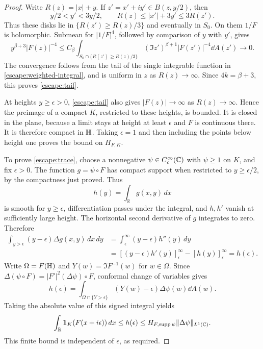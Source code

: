 \begin{proof}
Write $R(z)=|x|+y$.  If $z'=x'+iy'\in B(z,y/2)$, then
\[
 y/2<y'<3y/2,\qquad
 R(z)\le |x'|+3y'\le3R(z').
\]
Thus these disks lie in $\{R(z')\ge R(z)/3\}$ and eventually in $S_0$.
On them $1/F$ is holomorphic.  Submean for $|1/F|^4$, followed by
comparison of $y$ with $y'$, gives
\begin{equation}
 y^{\beta+3}|F(z)|^{-4}
 \le C_\beta\!\int_{S_0\cap\{R(z')\ge R(z)/3\}}
       (\Im z')^{\beta+1}|F(z')|^{-4}\dd A(z')
 \longrightarrow0.
 \label{escape:uniform-tail}
\end{equation}
The convergence follows from the tail of the single integrable function
in \eqref{escape:weighted-integral}, and is uniform in $z$ as
$R(z)\to\infty$.  Since $4k=\beta+3$, this proves
\eqref{escape:tail}.

At heights $y\ge\epsilon>0$, \eqref{escape:tail} also gives
$|F(z)|\to\infty$ as $R(z)\to\infty$.  Hence the preimage of a compact
$K$, restricted to these heights, is bounded.  It is closed in the
plane, because a limit stays at height at least $\epsilon$ and
$F$ is continuous there.  It is therefore compact in $\mathbb H$.
Taking $\epsilon=1$ and then including the points below height one
proves the bound on $H_{F,K}$.

To prove \eqref{escape:trace}, choose a nonnegative
$\psi\in C_c^\infty(\mathbb C)$ with $\psi\ge1$ on $K$, and fix $\epsilon>0$.
The function $g=\psi\circ F$ has compact support when restricted to
$y\ge\epsilon/2$, by the compactness just proved.  Thus
\[
 h(y)=\int_{\mathbb R}g(x,y)\,dx
\]
is smooth for $y\ge\epsilon$, differentiation passes under the integral,
and $h,h'$ vanish at sufficiently large height.  The horizontal second
derivative of $g$ integrates to zero.  Therefore
\[
 \begin{split}
 \int_{y>\epsilon}(y-\epsilon)\Delta g(x,y)\,dx\,dy
 &=\int_\epsilon^\infty(y-\epsilon)h''(y)\,dy\\
 &=[(y-\epsilon)h'(y)]_\epsilon^\infty
       -[h(y)]_\epsilon^\infty=h(\epsilon).
 \end{split}
\]
Write $\Omega=F(\mathbb H)$ and $Y(w)=\Im F^{-1}(w)$ for $w\in\Omega$.
Since $\Delta(\psi\circ F)=|F'|^2(\Delta\psi)\circ F$,
conformal change of variables gives
\[
 h(\epsilon)=
 \int_{\Omega\cap\{Y>\epsilon\}}(Y(w)-\epsilon)
                    \Delta\psi(w)\dd A(w).
\]
Taking the absolute value of this signed integral yields
\[
 \int_{\mathbb R}\mathbf1_K(F(x+i\epsilon))\,dx
 \le h(\epsilon)
 \le H_{F,\operatorname{supp}\psi}
                       \|\Delta\psi\|_{L^1(\mathbb C)}.
\]
This finite bound is independent of $\epsilon$, as required.
\end{proof}

